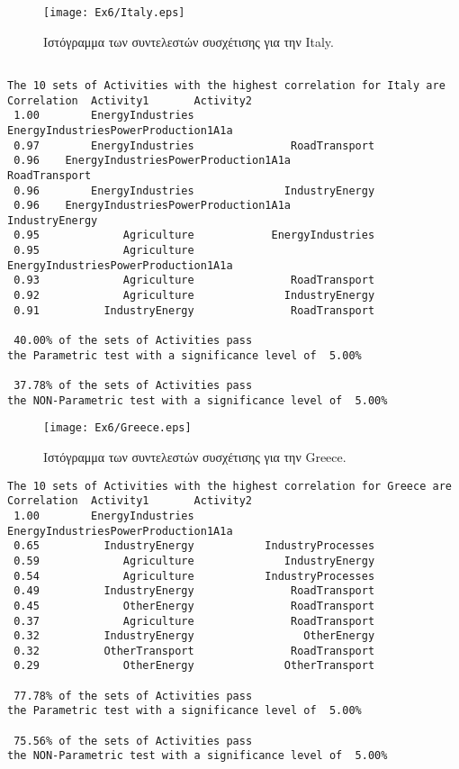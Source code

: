 \documentclass[11pt]{scrartcl} %
\begin{document}
\begin{figure}[H]
\label{fig:z6} 
	\centering
	\texttt{[image: Ex6/Italy.eps]}	
\caption{Ιστόγραμμα των συντελεστών συσχέτισης για την Italy.}
\end{figure}



\begin{verbatim}

The 10 sets of Activities with the highest correlation for Italy are
Correlation	 Activity1	 	 Activity2
 1.00	     EnergyIndustries	 	 EnergyIndustriesPowerProduction1A1a 
 0.97	     EnergyIndustries	 	        RoadTransport 
 0.96	 EnergyIndustriesPowerProduction1A1a	 	        RoadTransport 
 0.96	     EnergyIndustries	 	       IndustryEnergy 
 0.96	 EnergyIndustriesPowerProduction1A1a	 	       IndustryEnergy 
 0.95	          Agriculture	 	     EnergyIndustries 
 0.95	          Agriculture	 	 EnergyIndustriesPowerProduction1A1a 
 0.93	          Agriculture	 	        RoadTransport 
 0.92	          Agriculture	 	       IndustryEnergy 
 0.91	       IndustryEnergy	 	        RoadTransport 

 40.00% of the sets of Activities pass 
the Parametric test with a significance level of  5.00%

 37.78% of the sets of Activities pass 
the NON-Parametric test with a significance level of  5.00%
\end{verbatim}



\begin{figure}[H]
\label{fig:z6} 
	\centering
	\texttt{[image: Ex6/Greece.eps]}	
\caption{Ιστόγραμμα των συντελεστών συσχέτισης για την Greece.}
\end{figure}



\begin{verbatim}
The 10 sets of Activities with the highest correlation for Greece are
Correlation	 Activity1	 	 Activity2
 1.00	     EnergyIndustries	 	 EnergyIndustriesPowerProduction1A1a 
 0.65	       IndustryEnergy	 	    IndustryProcesses 
 0.59	          Agriculture	 	       IndustryEnergy 
 0.54	          Agriculture	 	    IndustryProcesses 
 0.49	       IndustryEnergy	 	        RoadTransport 
 0.45	          OtherEnergy	 	        RoadTransport 
 0.37	          Agriculture	 	        RoadTransport 
 0.32	       IndustryEnergy	 	          OtherEnergy 
 0.32	       OtherTransport	 	        RoadTransport 
 0.29	          OtherEnergy	 	       OtherTransport 

 77.78% of the sets of Activities pass 
the Parametric test with a significance level of  5.00%

 75.56% of the sets of Activities pass 
the NON-Parametric test with a significance level of  5.00%
\end{verbatim}
\end{document}
